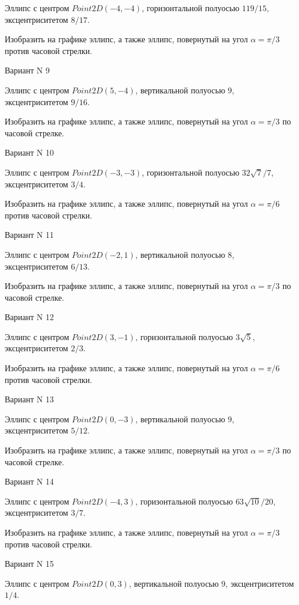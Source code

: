 \documentclass[11pt]{report}
\begin{document}
Эллипс с центром $Point2D\left(-4, -4\right)$, горизонтальной полуосью $119 / 15$, эксцентриситетом $8 / 17$.

    Изобразить на графике эллипс, а также эллипс, повернутый на угол $\alpha = $$\pi / 3$ против часовой стрелки.

Вариант N 9

Эллипс с центром $Point2D\left(5, -4\right)$, вертикальной полуосью $9$, эксцентриситетом $9 / 16$.

    Изобразить на графике эллипс, а также эллипс, повернутый на угол $\alpha = $$\pi / 3$ по часовой стрелке.

Вариант N 10

Эллипс с центром $Point2D\left(-3, -3\right)$, горизонтальной полуосью $32 \sqrt{7} / 7$, эксцентриситетом $3 / 4$.

    Изобразить на графике эллипс, а также эллипс, повернутый на угол $\alpha = $$\pi / 6$ против часовой стрелки.

Вариант N 11

Эллипс с центром $Point2D\left(-2, 1\right)$, вертикальной полуосью $8$, эксцентриситетом $6 / 13$.

    Изобразить на графике эллипс, а также эллипс, повернутый на угол $\alpha = $$\pi / 3$ по часовой стрелке.

Вариант N 12

Эллипс с центром $Point2D\left(3, -1\right)$, горизонтальной полуосью $3 \sqrt{5}$, эксцентриситетом $2 / 3$.

    Изобразить на графике эллипс, а также эллипс, повернутый на угол $\alpha = $$\pi / 6$ против часовой стрелки.

Вариант N 13

Эллипс с центром $Point2D\left(0, -3\right)$, вертикальной полуосью $9$, эксцентриситетом $5 / 12$.

    Изобразить на графике эллипс, а также эллипс, повернутый на угол $\alpha = $$\pi / 3$ по часовой стрелке.

Вариант N 14

Эллипс с центром $Point2D\left(-4, 3\right)$, горизонтальной полуосью $63 \sqrt{10} / 20$, эксцентриситетом $3 / 7$.

    Изобразить на графике эллипс, а также эллипс, повернутый на угол $\alpha = $$\pi / 3$ против часовой стрелки.

Вариант N 15

Эллипс с центром $Point2D\left(0, 3\right)$, вертикальной полуосью $9$, эксцентриситетом $1 / 4$.
\end{document}
